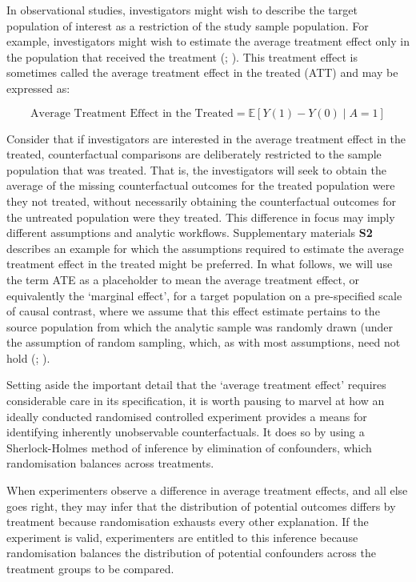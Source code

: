 \documentclass[
  single column]{article}
\begin{document}
In observational studies, investigators might wish to describe the
target population of interest as a restriction of the study sample
population. For example, investigators might wish to estimate the
average treatment effect only in the population that received the
treatment (;
). This treatment effect is
sometimes called the average treatment effect in the treated (ATT) and
may be expressed as:

\[
\text{Average Treatment Effect in the Treated} = \mathbb{E}[Y(1) - Y(0) \mid A = 1]
\]

Consider that if investigators are interested in the average treatment
effect in the treated, counterfactual comparisons are deliberately
restricted to the sample population that was treated. That is, the
investigators will seek to obtain the average of the missing
counterfactual outcomes for the treated population were they not
treated, without necessarily obtaining the counterfactual outcomes for
the untreated population were they treated. This difference in focus may
imply different assumptions and analytic workflows. Supplementary
materials \textbf{S2} describes an example for which the assumptions
required to estimate the average treatment effect in the treated might
be preferred. In what follows, we will use the term ATE as a placeholder
to mean the average treatment effect, or equivalently the `marginal
effect', for a target population on a pre-specified scale of causal
contrast, where we assume that this effect estimate pertains to the
source population from which the analytic sample was randomly drawn
(under the assumption of random sampling, which, as with most
assumptions, need not hold
(;
).

Setting aside the important detail that the `average treatment effect'
requires considerable care in its specification, it is worth pausing to
marvel at how an ideally conducted randomised controlled experiment
provides a means for identifying inherently unobservable
counterfactuals. It does so by using a Sherlock-Holmes method of
inference by elimination of confounders, which randomisation balances
across treatments.

When experimenters observe a difference in average treatment effects,
and all else goes right, they may infer that the distribution of
potential outcomes differs by treatment because randomisation exhausts
every other explanation. If the experiment is valid, experimenters are
entitled to this inference because randomisation balances the
distribution of potential confounders across the treatment groups to be
compared.
\end{document}

